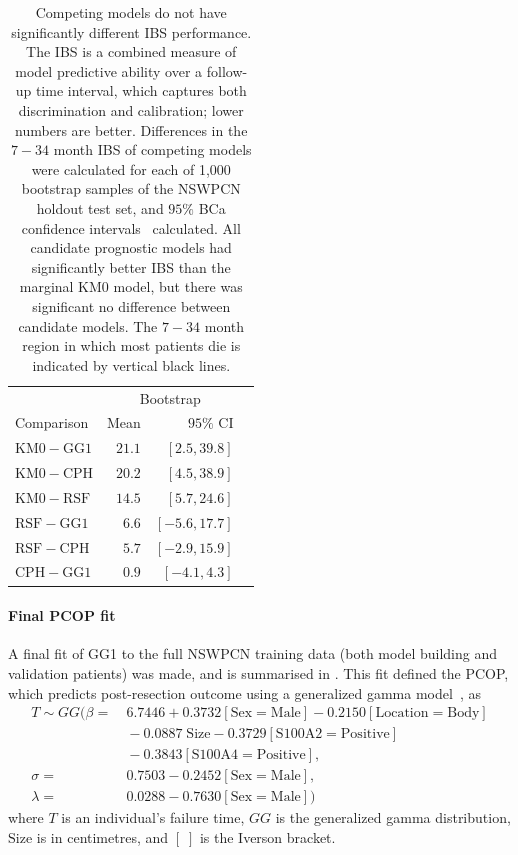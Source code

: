\documentclass[dissertation.tex]{subfiles}
\begin{document}
\begin{table}
\centering
\caption[Prognostic model \texorpdfstring{\acrshort{IBS}}{IBS} comparison]{Competing models do not have significantly different \gls{IBS} performance.  The \gls{IBS} is a combined measure of model predictive ability over a follow-up time interval, which captures both discrimination and calibration; lower numbers are better.  Differences in the $7-34$ month \gls{IBS} of competing models were calculated for each of 1,000 bootstrap samples of the \gls{NSWPCN} holdout test set, and $95\%$ BCa confidence intervals~\cite{Efron1987} calculated.  All candidate prognostic models had significantly better \gls{IBS} than the marginal KM0 model, but there was significant no difference between candidate models.  The $7-34$ month region in which most patients die is indicated by vertical black lines.}
\label{tab:nomo-ibs-boot}
\begin{tabular}{lrrr}
\toprule
                             & \multicolumn{2}{c}{Bootstrap}   \\ \cmidrule(r){2-3}
Comparison                   & Mean          & $95\%$ CI       \\ \midrule
$\mathrm{KM0} - \mathrm{GG1}$    & $21.1$        & $[2.5, 39.8]$   \\
$\mathrm{KM0} - \mathrm{CPH}$    & $20.2$        & $[4.5, 38.9]$   \\
$\mathrm{KM0} - \mathrm{RSF}$    & $14.5$        & $[5.7, 24.6]$   \\
$\mathrm{RSF} - \mathrm{GG1}$    &  $6.6$        & $[-5.6, 17.7]$  \\
$\mathrm{RSF} - \mathrm{CPH}$    &  $5.7$        & $[-2.9, 15.9]$  \\ 
$\mathrm{CPH} - \mathrm{GG1}$    &  $0.9$        & $[-4.1, 4.3]$   \\ \bottomrule
\end{tabular}
\end{table}

\paragraph{Final \texorpdfstring{\acrshort{PCOP}}{PCOP} fit}
A final fit of GG1 to the full \gls{NSWPCN} training data (both model building and validation patients) was made, and is summarised in .  This fit defined the \gls{PCOP}, which predicts post-resection outcome using a generalized gamma model~\cite{Cox2007}, as
\begin{align*}
T \sim GG(\beta   = &\ 6.7446 + 0.3732[\mathrm{Sex = Male}] - 0.2150[\mathrm{Location = Body}] \\
                    &\ -0.0887\;\mathrm{Size} - 0.3729[\mathrm{S100A2 = Positive}] \\
                    &\ -0.3843[\mathrm{S100A4 = Positive}], \\ 
          \sigma  = &\ 0.7503 - 0.2452[\mathrm{Sex = Male}],\\
          \lambda = &\ 0.0288 - 0.7630[\mathrm{Sex = Male}])
\end{align*}
where $T$ is an individual's failure time, $GG$ is the generalized gamma distribution, $\mathrm{Size}$ is in centimetres, and $[\;]$ is the Iverson bracket.
\end{document}
